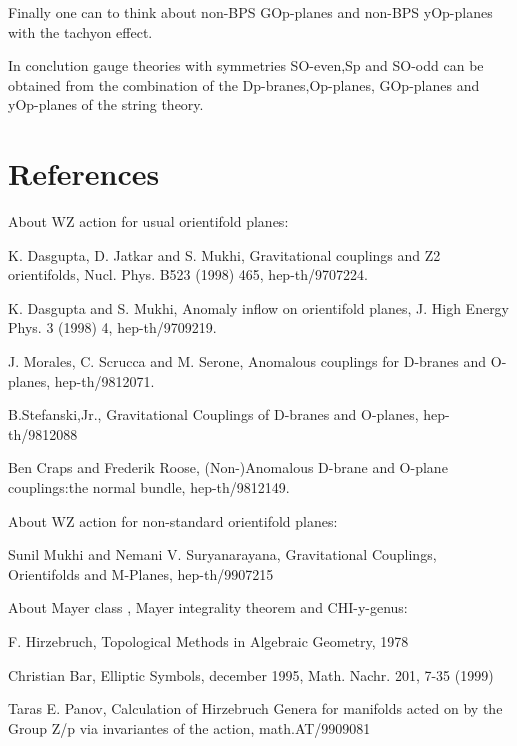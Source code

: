 \documentclass[a4paper,a4paper]{article}
\begin{document}
Finally one can to think about non-BPS GOp-planes  and non-BPS yOp-planes with the tachyon effect.

In conclution gauge theories with symmetries SO-even,Sp and SO-odd can be obtained from the combination of the Dp-branes,Op-planes, GOp-planes and yOp-planes of the string theory.

\section{References}

\setlength{\baselineskip}{20pt}
About WZ action for usual orientifold planes:

K. Dasgupta, D. Jatkar and S. Mukhi, Gravitational couplings and Z2 orientifolds, Nucl. Phys. B523 (1998) 465, hep-th/9707224.

K. Dasgupta and S. Mukhi, Anomaly inflow on orientifold planes, J. High Energy Phys. 3 (1998) 4, hep-th/9709219.

J. Morales, C. Scrucca and M. Serone, Anomalous couplings for D-branes and O-planes, hep-th/9812071.

B.Stefanski,Jr., Gravitational Couplings of D-branes and O-planes, hep-th/9812088

Ben Craps and Frederik Roose, (Non-)Anomalous D-brane and O-plane couplings:the normal bundle,  hep-th/9812149.

About WZ action for non-standard orientifold planes:

Sunil Mukhi and Nemani V. Suryanarayana,  Gravitational Couplings, Orientifolds and M-Planes,  hep-th/9907215


About Mayer class , Mayer integrality theorem and CHI-y-genus:

F. Hirzebruch, Topological Methods in Algebraic Geometry, 1978

Christian Bar,  Elliptic Symbols, december 1995, Math. Nachr. 201, 7-35 (1999)

Taras E. Panov,  Calculation of Hirzebruch Genera for manifolds acted on by the Group Z/p via invariantes of the action, math.AT/9909081

\setlength{\baselineskip}{50pt}   
\end{document}
